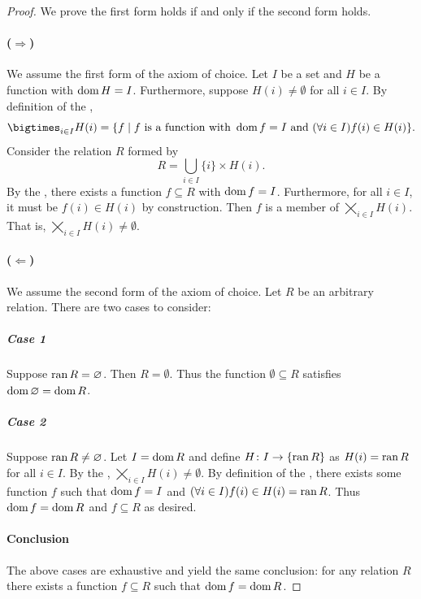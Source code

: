 \documentclass{report}
\begin{document}
  \begin{proof}
    We prove the first form holds if and only if the second form holds.

    \paragraph{($\Rightarrow$)}%

      We assume the first form of the axiom of choice.
      Let $I$ be a set and $H$ be a function with $\mathop{\text{dom}}{H} = I$.
      Furthermore, suppose $H(i) \neq \emptyset$ for all $i \in I$.
      By definition of the ,
        $$\bigtimes_{i \in I} H(i) = \{f \mid
          f \text{ is a function with } \dom{f} = I \text{ and }
            (\forall i \in I) f(i) \in H(i)\}.$$
      Consider the relation $R$ formed by
        $$R = \bigcup_{i \in I} \{i\} \times H(i).$$
      By the , there exists a function
        $f \subseteq R$ with $\mathop{\text{dom}}{f} = I$.
      Furthermore, for all $i \in I$, it must be $f(i) \in H(i)$ by
        construction.
      Then $f$ is a member of $\bigtimes_{i \in I} H(i)$.
      That is, $\bigtimes_{i \in I} H(i) \neq \emptyset$.

    \paragraph{($\Leftarrow$)}%

      We assume the second form of the axiom of choice.
      Let $R$ be an arbitrary relation.
      There are two cases to consider:

      \subparagraph{Case 1}%

        Suppose $\mathop{\text{ran}}{R} = \varnothing$.
        Then $R = \emptyset$.
        Thus the function $\emptyset \subseteq R$ satisfies
          $\mathop{\text{dom}}{\varnothing} = \mathop{\text{dom}}{R}$.

      \subparagraph{Case 2}%

        Suppose $\mathop{\text{ran}}{R} \neq \varnothing$.
        Let $I = \mathop{\text{dom}}{R}$ and define $H \colon I \rightarrow \{\mathop{\text{ran}}{R}\}$ as
          $H(i) = \mathop{\text{ran}}{R}$ for all $i \in I$.
        By the ,
          $\bigtimes_{i \in I} H(i) \neq \emptyset$.
        By definition of the , there exists some
          function $f$ such that $\mathop{\text{dom}}{f} = I$ and
          $(\forall i \in I) f(i) \in H(i) = \mathop{\text{ran}}{R}$.
        Thus $\mathop{\text{dom}}{f} = \mathop{\text{dom}}{R}$ and $f \subseteq R$ as desired.

      \paragraph{Conclusion}%

        The above cases are exhaustive and yield the same conclusion: for any
          relation $R$ there exists a function $f \subseteq R$ such that
          $\mathop{\text{dom}}{f} = \mathop{\text{dom}}{R}$.

  \end{proof}
\end{document}

